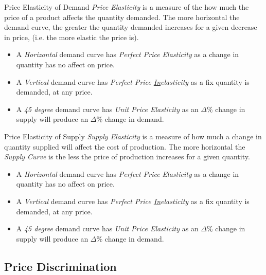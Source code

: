 \documentclass[11pt,a4paper]{article}
\begin{document}
\begin{definition}{Price Elasticity of Demand}
  \textit{Price Elasticity} is a measure of the how much the price of a product affects the quantity demanded. The more horizontal the demand curve, the greater the quantity demanded increases for a given decrease in price, (i.e. the more elastic the price is).
  \begin{itemize}
    \item A \textit{Horizontal} demand curve has \textit{Perfect Price Elasticity} as a change in quantity has no affect on price.
    \item A \textit{Vertical} demand curve has \textit{Perfect Price \underline{In}elasticity} as a fix quantity is demanded, at any price.
    \item A \textit{45 degree} demand curve has \textit{Unit Price Elasticity} as an $\Delta\%$ change in supply will produce an $\Delta\%$ change in demand.
  \end{itemize}
\end{definition}

\begin{definition}{Price Elasticity of Supply}
  \textit{Supply Elasticity} is a measure of how much a change in quantity supplied will affect the cost of production. The more horizontal the \textit{Supply Curve} is the less the price of production increases for a given quantity.
  \begin{itemize}
    \item A \textit{Horizontal} demand curve has \textit{Perfect Price Elasticity} as a change in quantity has no affect on price.
    \item A \textit{Vertical} demand curve has \textit{Perfect Price \underline{In}elasticity} as a fix quantity is demanded, at any price.
    \item A \textit{45 degree} demand curve has \textit{Unit Price Elasticity} as an $\Delta\%$ change in supply will produce an $\Delta\%$ change in demand.
  \end{itemize}
\end{definition}

\subsection{Price Discrimination}
\end{document}
